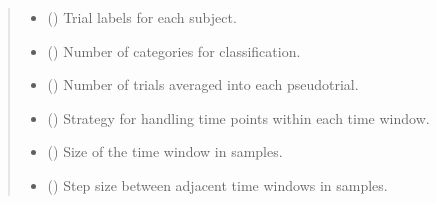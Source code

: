 \documentclass[letterpaper,10pt,english]{sphinxhowto}
\begin{document}
\begin{fulllineitems}
\begin{quote}
\begin{description}
\begin{itemize}
\item {} 
\sphinxAtStartPar
{} (\sphinxstyleliteralemphasis{\sphinxupquote{, }}\sphinxstyleliteralemphasis{\sphinxupquote{ {[}}}\sphinxstyleliteralemphasis{\sphinxupquote{, }}\sphinxstyleliteralemphasis{\sphinxupquote{{]}}}) \textendash{} Trial labels for each subject.

\item {} 
\sphinxAtStartPar
{} (\sphinxstyleliteralemphasis{\sphinxupquote{, }}) \textendash{} Number of categories for classification.

\item {} 
\sphinxAtStartPar
{} (\sphinxstyleliteralemphasis{\sphinxupquote{, }}) \textendash{} Number of trials averaged into each pseudo\sphinxhyphen{}trial.

\item {} 
\sphinxAtStartPar
{} (\sphinxstyleliteralemphasis{\sphinxupquote{, }}\sphinxstyleliteralemphasis{\sphinxupquote{, }}) \textendash{} Strategy for handling time points within each time window.

\item {} 
\sphinxAtStartPar
{} (\sphinxstyleliteralemphasis{\sphinxupquote{, }}) \textendash{} Size of the time window in samples.

\item {} 
\sphinxAtStartPar
{} (\sphinxstyleliteralemphasis{\sphinxupquote{, }}) \textendash{} Step size between adjacent time windows in samples.


\end{itemize}
\end{description}
\end{quote}
\end{fulllineitems}
\end{document}
